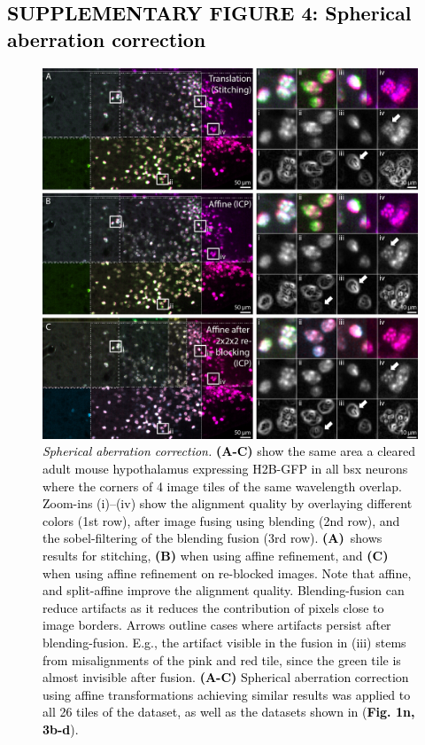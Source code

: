 \documentclass[]{spie}  %
\def\red{\textcolor{black}}
\begin{document}
\subsection*{\red{SUPPLEMENTARY FIGURE 4: Spherical aberration correction}}
\vspace{-2mm}
\begin{figure}[h!]
\includegraphics[width=\textwidth]{fig-sph_aberrations.jpg}
\vspace{-3mm}
\caption{\hspace{-0.5mm} \red{\emph{Spherical aberration correction.} \textbf{(A-C)} show the same area a cleared adult mouse hypothalamus expressing H2B-GFP in all bsx neurons where the corners of 4 image tiles of the same wavelength overlap. Zoom-ins (i)--(iv) show the alignment quality by overlaying different colors (1st row), after image fusing using blending (2nd row), and the sobel-filtering of the blending fusion (3rd row). \textbf{(A)}~shows results for stitching, \textbf{(B)} when using affine refinement, and \textbf{(C)} when using affine refinement on re-blocked images. Note that affine, and split-affine improve the alignment quality. Blending-fusion can reduce artifacts as it reduces the contribution of pixels close to image borders. Arrows outline cases where artifacts persist after blending-fusion. E.g., the artifact visible in the fusion in (iii) stems from misalignments of the pink and red tile, since the green tile is almost invisible after fusion. \textbf{(A-C)} Spherical aberration correction using affine transformations achieving similar results was applied to all 26 tiles of the dataset, as well as the datasets shown in (\textbf{Fig. 1n, 3b-d}). 
}}
\label{fig:sup-spherical}
\end{figure}
\end{document}
